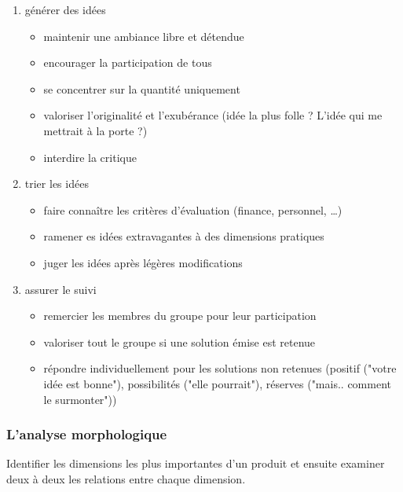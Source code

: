 			\begin{enumerate}
				\item générer des idées
				
				\begin{itemize}
					\item maintenir une ambiance libre et détendue
					\item encourager la participation de tous
					\item se concentrer sur la quantité uniquement
					\item valoriser l'originalité et l'exubérance (idée la plus folle ? L'idée qui me mettrait à la porte ?)
					\item interdire la critique
				\end{itemize}
				
				\item trier les idées
				
				\begin{itemize}
					\item faire connaître les critères d'évaluation (finance, personnel, \dots )
					\item ramener es idées extravagantes à des dimensions pratiques
					\item juger les idées après légères modifications
				\end{itemize}
				
				\item assurer le suivi
				
				\begin{itemize}
					\item remercier les membres du groupe pour leur participation
					\item valoriser tout le groupe si une solution émise est retenue
					\item répondre individuellement pour les solutions non retenues (positif ("votre idée est bonne"), possibilités ("elle pourrait"), réserves ("mais.. comment le surmonter"))
				\end{itemize}
			\end{enumerate}
		
		
			\subsubsection{L'analyse morphologique}
			
			Identifier les dimensions les plus importantes d'un produit et ensuite examiner deux à deux les relations entre chaque dimension.
			
